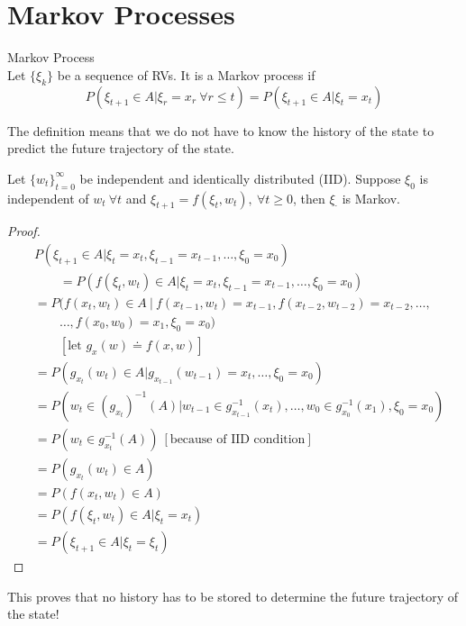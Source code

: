 \section{Markov Processes}
\begin{definition}{Markov Process} \\
Let $\{\xi_k\}$ be a sequence of RVs.
It is a Markov process if
$$P(\xi_{t+1}\in A|\xi_r=x_r~\forall r\leq t) = P(\xi_{t+1}\in A|\xi_t=x_t)$$
\end{definition}
The definition means that we do not have to know the history of the state to predict the future trajectory of the state.

\begin{theorem}
Let ${\{w_t\}}_{t=0}^\infty$ be independent and identically distributed (IID).
Suppose $\xi_0$ is independent of $w_t~\forall t$ and $\xi_{t+1} = f(\xi_t,w_t),~\forall t \geq 0$, then $\xi_\cdot$ is Markov.
\end{theorem}

\begin{proof}
\begin{align*}
&P(\xi_{t+1}\in A | \xi_t=x_t, \xi_{t-1}=x_{t-1}, \ldots, \xi_0=x_0) \\
&\qquad = P(f(\xi_t,w_t)\in A|\xi_t=x_t, \xi_{t-1}=x_{t-1}, \ldots, \xi_0=x_0) \\
&= P(f(x_t,w_t)\in A~|~f(x_{t-1},w_t)=x_{t-1}, f(x_{t-2},w_{t-2})=x_{t-2},\ldots, \\
&\qquad \ldots,f(x_0,w_0)=x_1,\xi_0=x_0) \\
&\qquad [\text{let }g_x(w) \doteq f(x,w)] \\
&= P(g_{x_t}(w_t)\in A|g_{x_{t-1}}(w_{t-1})=x_t,\dots,\xi_0=x_0) \\
&= P(w_t\in{(g_{x_t})}^{-1}(A)|w_{t-1}\in g_{x_{t-1}}^{-1}(x_t),\ldots, w_0\in g_{x_0}^{-1}(x_1),\xi_0=x_0) \\
&= P(w_t\in g_{x_t}^{-1}(A))~[\text{because of IID condition}] \\
&= P(g_{x_t}(w_t)\in A) \\
&= P(f(x_t,w_t)\in A) \\
&= P(f(\xi_t,w_t)\in A|\xi_t=x_t) \\
&= P(\xi_{t+1}\in A|\xi_t=\xi_t)
\end{align*}
\end{proof}
This proves that no history has to be stored to determine the future trajectory of the state!

